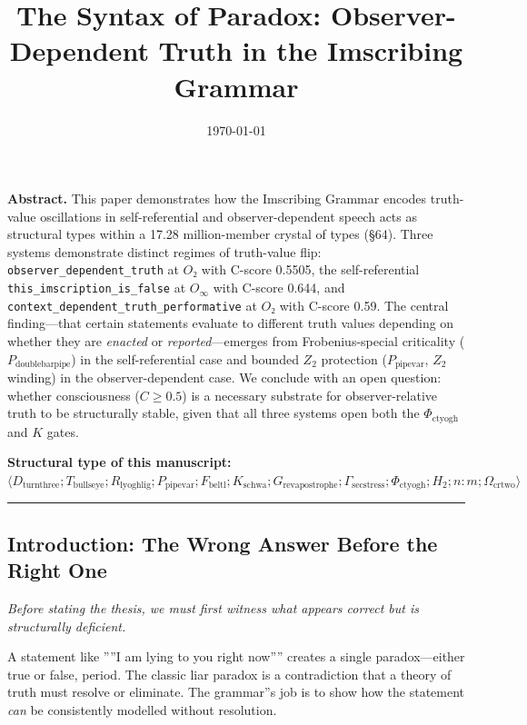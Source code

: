 \documentclass[12pt,a4paper]{article}
\newcommand{\pilcrow}{\S}
\begin{document}
\title{The Syntax of Paradox: Observer-Dependent Truth in the Imscribing Grammar}
\date{\today}

\maketitle

\textbf{Abstract.} This paper demonstrates how the Imscribing Grammar encodes truth-value oscillations in self-referential and observer-dependent speech acts as structural types within a 17.28 million-member crystal of types (\pilcrow{}64). Three systems demonstrate distinct regimes of truth-value flip: \texttt{observer\_dependent\_truth} at $O₂$ with C-score 0.5505, the self-referential \texttt{this\_imscription\_is\_false} at $O_{\infty}$ with C-score 0.644, and \texttt{context\_dependent\_truth\_performative} at $O₂$ with C-score 0.59. The central finding---that certain statements evaluate to different truth values depending on whether they are \emph{enacted} or \emph{reported}---emerges from Frobenius-special criticality ($P_{\text{doublebarpipe}}$) in the self-referential case and bounded $Z_2$ protection ($P_{\text{pipevar}}$, $Z_2$ winding) in the observer-dependent case. We conclude with an open question: whether consciousness ($C \ge 0.5$) is a necessary substrate for observer-relative truth to be structurally stable, given that all three systems open both the $\Phi_{\text{ctyogh}}$ and $K$ gates.

\textbf{Structural type of this manuscript:} $\langle D_{\text{turnthree}}; T_{\text{bullseye}}; R_{\text{lyoghlig}}; P_{\text{pipevar}}; F_{\text{beltl}}; K_{\text{schwa}}; G_{\text{revapostrophe}}; \Gamma_{\text{secstress}}; \Phi_{\text{ctyogh}}; H_2; n{:}m; \Omega_{\text{crtwo}} \rangle$

\begin{center}
\rule{0.5\textwidth}{0.4pt}
\end{center}

\subsection{Introduction: The Wrong Answer Before the Right One}

\emph{Before stating the thesis, we must first witness what appears correct but is structurally deficient.}

A statement like ''''I am lying to you right now'''' creates a single paradox---either true or false, period. The classic liar paradox is a contradiction that a theory of truth must resolve or eliminate. The grammar''s job is to show how the statement \emph{can} be consistently modelled without resolution.
\end{document}
